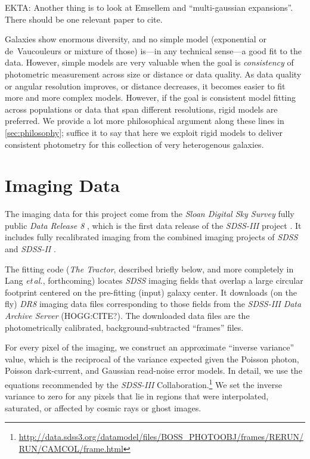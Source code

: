 \documentclass[12pt,preprint,pdftex]{aastex}
\newcommand{\project}[1]{\textsl{#1}}
\newcommand{\foreign}[1]{\emph{#1}}
\newcommand{\etal}{\foreign{et\,al.}}
\begin{document}
EKTA: Another thing is to look at Emsellem and ``multi-gaussian
expansions''.  There should be one relevant paper to cite.

Galaxies show enormous diversity, and no simple model (exponential or
de~Vaucouleurs or mixture of those) is---in any technical sense---a
good fit to the data.  However, simple models are very valuable when
the goal is \emph{consistency} of photometric measurement across size
or distance or data quality.  As data quality or angular resolution
improves, or distance decreases, it becomes easier to fit more and
more complex models.  However, if the goal is consistent model fitting
across populations or data that span different resolutions, rigid
models are preferred.  We provide a lot more philosophical argument
along these lines in \ref{sec:philosophy}; suffice it to say that here we
exploit rigid models to deliver consistent photometry for this
collection of very heterogenous galaxies.

\section{Imaging Data}\label{sec:data}
The imaging data for this project come from the \project{Sloan Digital
  Sky Survey} fully public \project{Data Release 8} \citep{dr8}, which is
the first data release of the \project{SDSS-III} project \citep{sdssiii}.  It
includes fully recalibrated imaging \citep{padmanabhan} from the
combined imaging projects of \project{SDSS} \citep{york}  and
\project{SDSS-II} \citep{sdssii}.

The fitting code (\project{The Tractor}, described briefly below, and
more completely in Lang \etal, forthcoming) locates \project{SDSS}
imaging fields that overlap a large circular footprint centered on the
pre-fitting (input) galaxy center.  It downloads (on the fly)
\project{DR8} imaging data files corresponding to those fields from
the \project{SDSS-III} \project{Data Archive Server} (HOGG:CITE?).  The
downloaded data files are the photometrically calibrated,
background-subtracted ``frames'' files.

For every pixel of the imaging, we construct an approximate ``inverse
variance'' value, which is the reciprocal of the variance expected
given the Poisson photon, Poisson dark-current, and Gaussian
read-noise error models.  In detail, we use the equations recommended
by the \project{SDSS-III}
Collaboration.\footnote{\url{http://data.sdss3.org/datamodel/files/BOSS\_PHOTOOBJ/frames/RERUN/RUN/CAMCOL/frame.html}}
We set the inverse variance to zero for any pixels that lie in regions
that were interpolated, saturated, or affected by cosmic rays or ghost
images.
\end{document}
